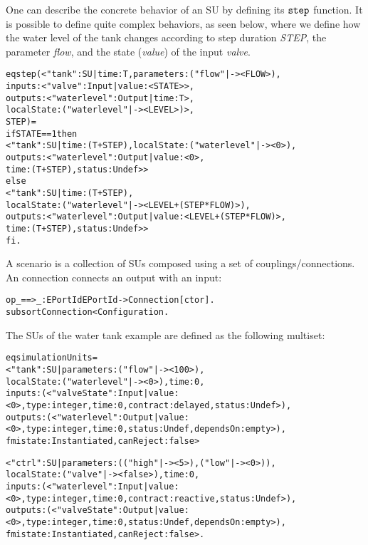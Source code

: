 One can describe the concrete behavior of an SU by defining its $\mathtt{step}_{}$ function.
It is possible to define quite complex behaviors, as seen below, where we define how the water level of the tank changes according to step duration \textit{STEP}, the parameter \textit{flow}, and the state (\textit{value}) of the input \textit{valve}.

\begin{alltt}
  \small
eq step(< "tank" : SU | time : T, parameters : ("flow" |-> < FLOW >), 
                    inputs : < "valve" : Input | value : < STATE > >, 
                    outputs : < "waterlevel" : Output | time : T >,
                    localState : ( "waterlevel" |-> < LEVEL > ) >,
                    STEP) = 
if STATE == 1 then 
  < "tank" : SU | time:(T + STEP), localState : ( "waterlevel" |-> < 0 > ),
  outputs : < "waterlevel" : Output | value : < 0 >, 
  time : (T + STEP), status : Undef > >
  else 
  < "tank" : SU | time : (T + STEP), 
  localState : ( "waterlevel" |-> < LEVEL + (STEP * FLOW) > ), 
  outputs : < "waterlevel" : Output | value : < LEVEL + (STEP * FLOW) >, 
  time : (T + STEP), status : Undef > > 
fi .
\end{alltt}

A scenario is a collection of SUs composed using a set of couplings/connections.
An connection connects an output with an input:
\begin{alltt}
  \small
op _==>_ : EPortId EPortId -> Connection [ctor] .
subsort Connection < Configuration .
\end{alltt}

The SUs of the water tank example are defined as the following multiset:
\begin{alltt}
  \small
eq simulationUnits = 
< "tank" : SU | parameters : ("flow" |-> < 100 >),
 localState : ( "waterlevel" |-> < 0 > ) , time : 0, 
 inputs : (< "valveState" : Input | value : < 0 >, type : integer, time : 0, contract : delayed, status : Undef  >), 
 outputs : (< "waterlevel" : Output | value : < 0 >, type : integer, time : 0, status : Undef, dependsOn : empty >), 
 fmistate : Instantiated, canReject : false >

< "ctrl" : SU | parameters : (("high" |-> < 5 >) , ("low" |-> < 0 >)), 
localState : ( "valve" |-> < false > ), time : 0, 
inputs : (< "waterlevel" : Input | value : < 0 >, type : integer, time : 0, contract : reactive, status : Undef  >), 
outputs : (< "valveState" : Output | value : < 0 >, type : integer, time : 0, status : Undef, dependsOn : empty >), 
fmistate : Instantiated, canReject : false > .
\end{alltt}

